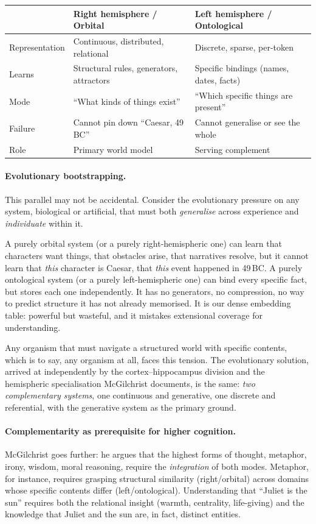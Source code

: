 \documentclass[11pt, a4paper]{article}
\theoremstyle{remark}
\begin{document}
\begin{center}
\begin{tabular}{lll}
\toprule
& \textbf{Right hemisphere / Orbital} & \textbf{Left hemisphere / Ontological} \\
\midrule
Representation & Continuous, distributed, relational & Discrete, sparse, per-token \\
Learns & Structural rules, generators, attractors & Specific bindings (names, dates, facts) \\
Mode & ``What kinds of things exist'' & ``Which specific things are present'' \\
Failure & Cannot pin down ``Caesar, 49\,BC'' & Cannot generalise or see the whole \\
Role & Primary world model & Serving complement \\
\bottomrule
\end{tabular}
\end{center}

\paragraph{Evolutionary bootstrapping.}
This parallel may not be accidental.
Consider the evolutionary pressure on any system, biological or artificial, that must both \emph{generalise} across experience and \emph{individuate} within it.

A purely orbital system (or a purely right-hemispheric one) can learn that characters want things, that obstacles arise, that narratives resolve, but it cannot learn that \emph{this} character is Caesar, that \emph{this} event happened in 49\,BC.
A purely ontological system (or a purely left-hemispheric one) can bind every specific fact, but stores each one independently.
It has no generators, no compression, no way to predict structure it has not already memorised.
It is our dense embedding table: powerful but wasteful, and it mistakes extensional coverage for understanding.

Any organism that must navigate a structured world with specific contents, which is to say, any organism at all, faces this tension.
The evolutionary solution, arrived at independently by the cortex--hippocampus division \cite{mcclelland1995complementary} and the hemispheric specialisation McGilchrist documents, is the same: \emph{two complementary systems}, one continuous and generative, one discrete and referential, with the generative system as the primary ground.

\paragraph{Complementarity as prerequisite for higher cognition.}
McGilchrist goes further: he argues that the highest forms of thought, metaphor, irony, wisdom, moral reasoning, require the \emph{integration} of both modes.
Metaphor, for instance, requires grasping structural similarity (right/orbital) across domains whose specific contents differ (left/ontological).
Understanding that ``Juliet is the sun'' requires both the relational insight (warmth, centrality, life-giving) and the knowledge that Juliet and the sun are, in fact, distinct entities.
\end{document}
